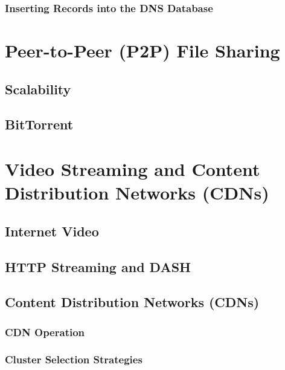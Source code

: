 \documentclass[12pt letter]{report}
\begin{document}
\subsection{Inserting Records into the DNS Database}

\chapter{Peer-to-Peer (P2P) File Sharing}

\section{Scalability}

\section{BitTorrent}

\chapter{Video Streaming and Content Distribution Networks (CDNs)}

\section{Internet Video}

\section{HTTP Streaming and DASH}

\section{Content Distribution Networks (CDNs)}

\subsection{CDN Operation}

\subsection{Cluster Selection Strategies}
\end{document}
